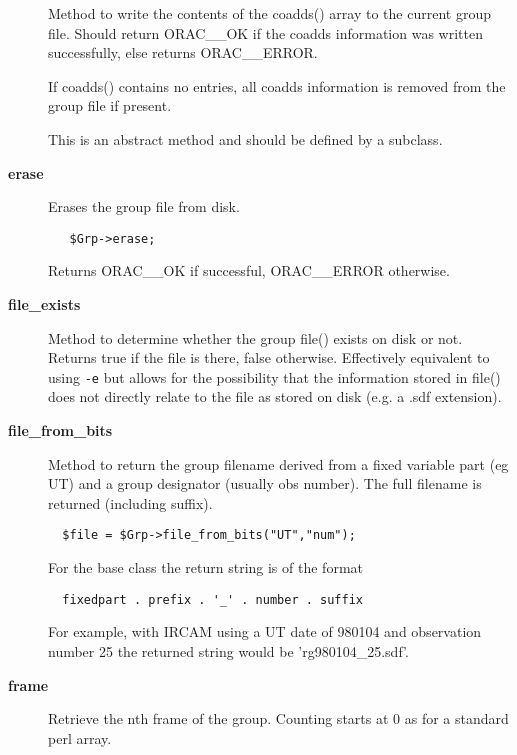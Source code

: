 \begin{description}
Method to write the contents of the coadds() array to the current
group file. Should return ORAC\_\_OK if the coadds information was written
successfully, else returns ORAC\_\_ERROR.



If coadds() contains no entries, all coadds information is removed from
the group file if present.



This is an abstract method and should be defined by a subclass.

\item[\textbf{erase}] \mbox{}

Erases the group file from disk.

\begin{verbatim}
   $Grp->erase;
\end{verbatim}


Returns ORAC\_\_OK if successful, ORAC\_\_ERROR otherwise.

\item[\textbf{file\_exists}] \mbox{}

Method to determine whether the group file() exists on disk or not.
Returns true if the file is there, false otherwise. Effectively
equivalent to using \texttt{-e} but allows for the possibility that the
information stored in file() does not directly relate to the
file as stored on disk (e.g. a .sdf extension).

\item[\textbf{file\_from\_bits}] \mbox{}

Method to return the group filename derived from a fixed
variable part (eg UT) and a group designator (usually obs
number). The full filename is returned (including suffix).

\begin{verbatim}
  $file = $Grp->file_from_bits("UT","num");
\end{verbatim}


For the base class the return string is of the format

\begin{verbatim}
  fixedpart . prefix . '_' . number . suffix
\end{verbatim}


For example, with IRCAM using a UT date of 980104 and observation
number 25 the returned string would be 'rg980104\_25.sdf'.

\item[\textbf{frame}] \mbox{}

Retrieve the nth frame of the group.
Counting starts at 0 as for a standard perl array.


\end{description}
